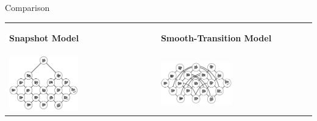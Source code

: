 	\begin{frame}{Comparison}
		\begin{tabularx}{\textwidth}{XX}
			\begin{center}
				\textbf{Snapshot Model}
			\end{center}
			&
			\begin{center}
			\textbf{Smooth-Transition Model}
			\end{center} \\
			\includegraphics[width=0.48\textwidth]{images/snapshot_model_neighborhood_graph_simple.png}
			&
			\includegraphics[width=0.48\textwidth]{images/smooth_transitions_neighborhood_graph.png}
		\end{tabularx}
	\end{frame}


